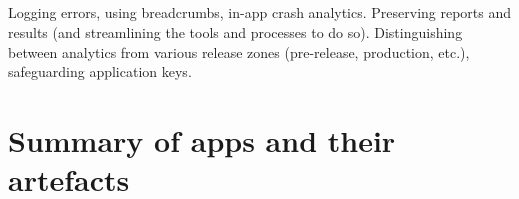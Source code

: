 \subsection{\iartefacts}
Logging errors, using breadcrumbs, in-app crash analytics. Preserving reports and results (and streamlining the tools and processes to do so). Distinguishing between analytics from various release zones (pre-release, production, etc.), safeguarding application keys.  


\section{Summary of apps and their artefacts}~\label{aata-summary-section}

